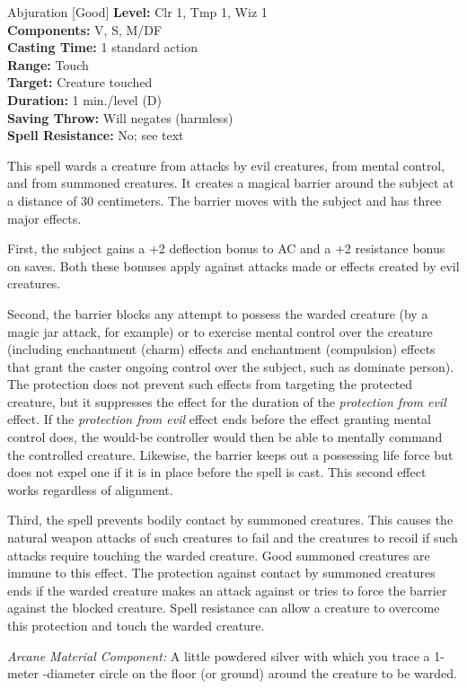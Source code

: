 {Abjuration [Good]}
{
	\textbf{Level:}
	Clr 1, Tmp 1, Wiz 1\\
	\textbf{Components:}
	V, S, M/DF\\
	\textbf{Casting Time:}
	1 standard action\\
	\textbf{Range:}
	Touch\\
	\textbf{Target:}
	Creature touched\\
	\textbf{Duration:}
	1 min./level (D)\\
	\textbf{Saving Throw:}
	Will negates (harmless)\\
	\textbf{Spell Resistance:}
	No; see text\\
}
{
	This spell wards a creature from attacks by evil creatures, from mental control, and from summoned creatures. It creates a magical barrier around the subject at a distance of 30 centimeters. The barrier moves with the subject and has three major effects.

	First, the subject gains a +2 deflection bonus to AC and a +2 resistance bonus on saves. Both these bonuses apply against attacks made or effects created by evil creatures.

	Second, the barrier blocks any attempt to possess the warded creature (by a magic jar attack, for example) or to exercise mental control over the creature (including enchantment (charm) effects and enchantment (compulsion) effects that grant the caster ongoing control over the subject, such as dominate person). The protection does not prevent such effects from targeting the protected creature, but it suppresses the effect for the duration of the \emph{protection from evil} effect. If the \emph{protection from evil} effect ends before the effect granting mental control does, the would-be controller would then be able to mentally command the controlled creature. Likewise, the barrier keeps out a possessing life force but does not expel one if it is in place before the spell is cast. This second effect works regardless of alignment.

	Third, the spell prevents bodily contact by summoned creatures. This causes the natural weapon attacks of such creatures to fail and the creatures to recoil if such attacks require touching the warded creature. Good summoned creatures are immune to this effect. The protection against contact by summoned creatures ends if the warded creature makes an attack against or tries to force the barrier against the blocked creature. Spell resistance can allow a creature to overcome this protection and touch the warded creature.

	\textit{Arcane Material Component:}
	A little powdered silver with which you trace a 1-meter -diameter circle on the floor (or ground) around the creature to be warded.

}
